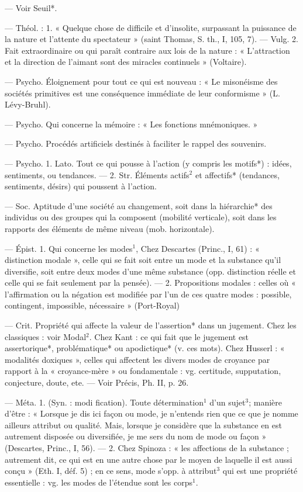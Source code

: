\begin{itemize}[leftmargin=1cm, label=, itemsep=1pt]
 — Voir Seuil*.

 — Théol. : 1. « Quelque chose
de difficile et d'insolite, surpassant
la puissance de la nature et l'attente
du spectateur » (saint Thomas,
S. th., I, 105, 7). — Vulg. 2. Fait
extraordinaire ou qui paraît contraire aux lois de la nature : « L'attraction et la direction de l’aimant
sont des miracles continuels » (Voltaire).

 — Psycho. Éloignement
pour tout ce qui est nouveau : « Le
misonéisme des sociétés primitives
est une conséquence immédiate de
leur conformisme » (L. Lévy-Bruhl).

 — Psycho. Qui concerne
la mémoire : « Les fonctions mnémoniques. »

 — Psycho. Procédés
artificiels destinés à faciliter le
rappel des souvenirs.

 — Psycho. 1. Lato. Tout ce
qui pousse à l’action (y compris les
motifs*) : idées, sentiments, ou
tendances. — 2. Str. Éléments actifs$^2$
et affectifs* (tendances, sentiments,
désirs) qui poussent à l’action.

 — Soc. Aptitude
d'une société au changement, soit
dans la hiérarchie* des individus ou
des groupes qui la composent (mobilité verticale), soit dans les rapports
des éléments de même niveau (mob.
horizontale).

 — Épist. 1. Qui concerne les
modes$^1$, Chez Descartes (Princ., I,
61) : « distinction modale », celle qui
se fait soit entre un mode et la substance
qu'il diversifie, soit entre
deux modes d’une même substance
(opp. distinction réelle et celle qui
se fait seulement par la pensée). —
2. Propositions modales : celles où
« l'affirmation ou la négation est
modifiée par l'un de ces quatre
modes : possible, contingent, impossible, nécessaire » (Port-Royal)

 — Crit. Propriété qui affecte
la valeur de l’assertion* dans un
jugement. Chez les classiques : voir
Modal$^2$. Chez Kant : ce qui fait que
le jugement est assertorique*, problématique* ou apodictique* (v. ces
mots). Chez Husserl : « modalités
doxiques », celles qui affectent les
divers modes de croyance par rapport à la « croyance-mère » ou fondamentale : vg. certitude, supputation, conjecture, doute, ete. — Voir
Précis, Ph. II, p. 26.

 — Méta. 1. (Syn. : modi
fication). Toute détermination$^1$ d’un
sujet$^3$; manière d’être : « Lorsque je
dis ici façon ou mode, je n’entends
rien que ce que je nomme ailleurs
attribut ou qualité. Mais, lorsque je
considère que la substance en est autrement disposée ou diversifiée, je
me sers du nom de mode ou façon »
(Descartes, Princ., I, 56). — 2. Chez
Spinoza : « les affections de la substance ; autrement dit, ce qui est en
une autre chose par le moyen de
laquelle il est aussi conçu » (Eth. I,
déf. 5) ; en ce sens, mode s’opp. à
attribut$^3$ qui est une propriété essentielle : vg. les modes de l'étendue
sont les corps$^1$.


\end{itemize}

